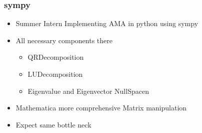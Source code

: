 \documentclass[tikz]{beamer}
\begin{document}







    




    

  




\begin{frame}
  \frametitle{sympy}
  
  \begin{itemize}
  \item Summer Intern Implementing AMA in python using sympy
  \item All necessary components there
    \begin{itemize}
    \item QRDecomposition
    \item LUDecomposition
    \item Eigenvalue and Eigenvector  NullSpacen
    \end{itemize}
  \item Mathematica more comprehensive Matrix manipulation
  \item Expect same bottle neck
  \end{itemize}
\end{frame}
\end{document}
